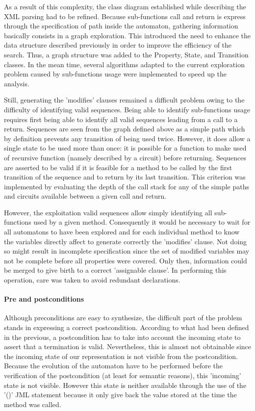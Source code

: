 As a result of this complexity, the class diagram established while describing the XML parsing had to be refined. Because sub-functions call and return is express through the specification of path inside the automaton, gathering information basically consists in a graph exploration. This introduced the need to enhance the data structure described previously in order to improve the efficiency of the search. Thus, a graph structure was added to the Property, State, and Transition classes. In the mean time, several algorithms adapted to the current exploration problem caused by sub-functions usage were implemented to speed up the analysis. 

Still, generating the 'modifies' clauses remained a difficult problem owing to the difficulty of identifying valid sequences. Being able to identify sub-functions usage requires first being able to identify all valid sequences leading from a call to a return. Sequences are seen from the graph defined above as a simple path which by definition prevents any transition of being used twice. However, it does allow a single state to be used more than once: it is possible for a function to make used of recursive function (namely described by a circuit) before returning. Sequences are asserted to be valid if it is feasible for a method to be called by the first transition of the sequence and to return by its last transition. This criterion was implemented by evaluating the depth of the call stack for any of the simple paths and circuits available between a given call and return. 

However, the exploitation valid sequences allow simply identifying all sub-functions used by a given method. Consequently it would be necessary to wait for all automatons to have been explored and for each individual method to know the variables directly affect to generate correctly the 'modifies' clause. Not doing so might result in incomplete specification since the set of modified variables may not be complete before all properties were covered. Only then, information could be merged to give birth to a correct 'assignable clause'. In performing this operation, care was taken to avoid redundant declarations. 

\paragraph{Pre and postconditions}
Although preconditions are easy to synthesize, the difficult part of the problem stands in expressing a correct postcondition. According to what had been defined in the previous, a postcondition has to take into account the incoming state to assert that a termination is valid. Nevertheless, this is almost not obtainable since the incoming state of our representation is not visible from the postcondition. Because the evolution of the automaton have to be performed before the verification of the postcondition (at least for semantic reasons), this 'incoming' state is not visible. However this state is neither available through the use of the '\old()' JML statement because it only give back the value stored at the time the method was called. 

